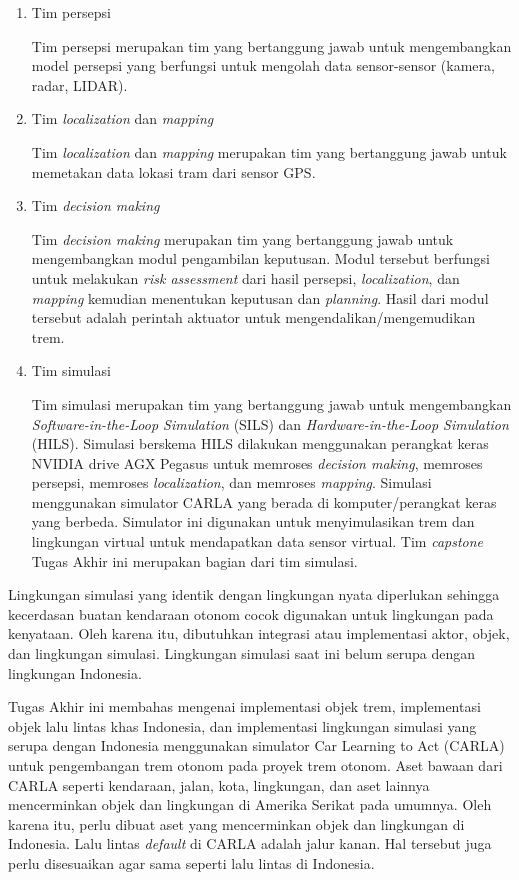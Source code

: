 \begin{enumerate}
    \item Tim persepsi

    Tim persepsi merupakan tim yang bertanggung jawab untuk mengembangkan model
    persepsi yang berfungsi untuk mengolah data sensor-sensor (kamera, radar,
    LIDAR).

    \item Tim \textit{localization} dan \textit{mapping}

    Tim \textit{localization} dan \textit{mapping} merupakan tim yang
    bertanggung jawab untuk memetakan data lokasi tram dari sensor GPS.

    \item Tim \textit{decision making}

    Tim \textit{decision making} merupakan tim yang bertanggung jawab untuk
    mengembangkan modul pengambilan keputusan. Modul tersebut berfungsi untuk
    melakukan \textit{risk assessment} dari hasil persepsi,
    \textit{localization}, dan \textit{mapping} kemudian menentukan keputusan
    dan \textit{planning}. Hasil dari modul tersebut adalah perintah aktuator
    untuk mengendalikan/mengemudikan trem.

    \item Tim simulasi

    Tim simulasi merupakan tim yang bertanggung jawab untuk mengembangkan
    \textit{Software-in-the-Loop Simulation} (SILS) dan
    \textit{Hardware-in-the-Loop Simulation} (HILS). Simulasi berskema HILS
    dilakukan menggunakan perangkat keras NVIDIA drive AGX Pegasus untuk
    memroses \textit{decision making}, memroses persepsi, memroses
    \textit{localization}, dan memroses \textit{mapping}. Simulasi menggunakan
    simulator CARLA yang berada di komputer/perangkat keras yang berbeda.
    Simulator ini digunakan untuk menyimulasikan trem dan lingkungan virtual
    untuk mendapatkan data sensor virtual. Tim \textit{capstone} Tugas Akhir ini
    merupakan bagian dari tim simulasi.

\end{enumerate}

Lingkungan simulasi yang identik dengan lingkungan nyata diperlukan sehingga
kecerdasan buatan kendaraan otonom cocok digunakan untuk lingkungan pada
kenyataan. Oleh karena itu, dibutuhkan integrasi atau implementasi aktor, objek,
dan lingkungan simulasi. Lingkungan simulasi saat ini belum serupa dengan
lingkungan Indonesia.

Tugas Akhir ini membahas mengenai implementasi objek trem, implementasi objek
lalu lintas khas Indonesia, dan implementasi lingkungan simulasi yang serupa
dengan Indonesia menggunakan simulator Car Learning to Act (CARLA) untuk
pengembangan trem otonom pada proyek trem otonom. Aset bawaan dari CARLA seperti
kendaraan, jalan, kota, lingkungan, dan aset lainnya mencerminkan objek dan
lingkungan di Amerika Serikat pada umumnya. Oleh karena itu, perlu dibuat aset
yang mencerminkan objek dan lingkungan di Indonesia. Lalu lintas
\textit{default} di CARLA adalah jalur kanan. Hal tersebut juga perlu
disesuaikan agar sama seperti lalu lintas di Indonesia.

